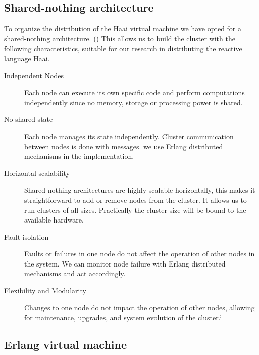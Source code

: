 \documentclass[a4paper]{book}
\begin{document}
\subsection{Shared-nothing architecture}
To organize the distribution of the Haai virtual machine we have opted for a shared-nothing architecture. (\cite{DBLP:journals/debu/Stonebraker86}) This allows us to build the cluster with the following characteristics, suitable for our research in distributing the reactive language Haai.
\begin{description}
	\item[Independent Nodes] Each node can execute its own specific code and perform computations independently since no memory, storage or processing power is shared.
	\item[No shared state] Each node manages its state independently. Cluster communication between nodes is done with messages. we use Erlang distributed mechanisms in the implementation.
	\item[Horizontal scalability] Shared-nothing architectures are highly scalable horizontally, this makes it straightforward to add or remove nodes from the cluster. It allows us to run clusters of all sizes. Practically the cluster size will be bound to the available hardware.
	\item[Fault isolation] Faults or failures in one node do not affect the operation of other nodes in the system. We can monitor node failure with Erlang distributed mechanisms and act accordingly. 
	\item[Flexibility and Modularity] Changes to one node do not impact the operation of other nodes, allowing for maintenance, upgrades, and system evolution of the cluster.` 
\end{description}

\subsection{Erlang virtual machine}
\end{document}
